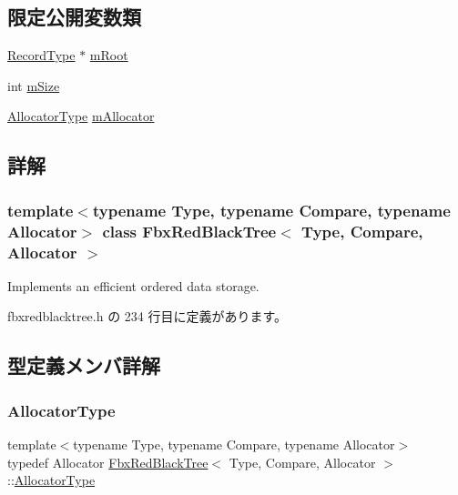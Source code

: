 \subsection*{限定公開変数類}
\begin{DoxyCompactItemize}
\item 
\hyperlink{class_fbx_red_black_tree_1_1_record_type}{Record\+Type} $\ast$ \hyperlink{class_fbx_red_black_tree_a1c8e942b25077e380f93a61aaadd8679}{m\+Root}
\item 
int \hyperlink{class_fbx_red_black_tree_a45b29bfeaffd897c186440fef29b6dfe}{m\+Size}
\item 
\hyperlink{class_fbx_red_black_tree_a62c49ab2e7d602aac98a9413e490ca90}{Allocator\+Type} \hyperlink{class_fbx_red_black_tree_aefc2938bd74cea7e072d344d5b038af1}{m\+Allocator}
\end{DoxyCompactItemize}


\subsection{詳解}
\subsubsection*{template$<$typename Type, typename Compare, typename Allocator$>$\newline
class Fbx\+Red\+Black\+Tree$<$ Type, Compare, Allocator $>$}

Implements an efficient ordered data storage. 

 fbxredblacktree.\+h の 234 行目に定義があります。



\subsection{型定義メンバ詳解}
\mbox{\label{class_fbx_red_black_tree_a62c49ab2e7d602aac98a9413e490ca90}} 
\subsubsection{\texorpdfstring{Allocator\+Type}{AllocatorType}}
{\footnotesize\ttfamily template$<$typename Type, typename Compare, typename Allocator$>$ \\
typedef Allocator \hyperlink{class_fbx_red_black_tree}{Fbx\+Red\+Black\+Tree}$<$ Type, Compare, Allocator $>$\+::\hyperlink{class_fbx_red_black_tree_a62c49ab2e7d602aac98a9413e490ca90}{Allocator\+Type}}



